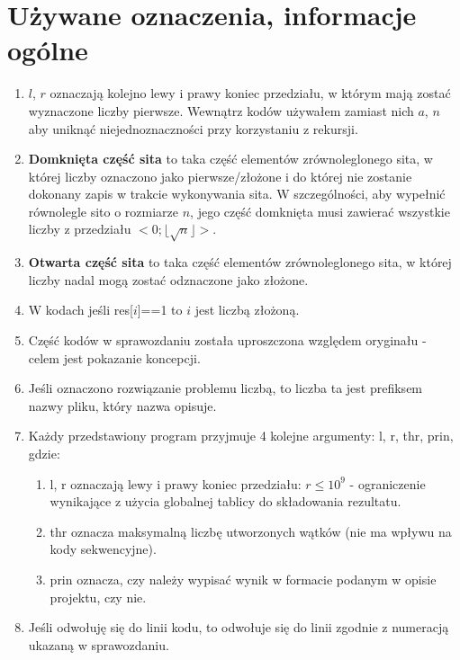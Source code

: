 \documentclass[12pt]{article}
\begin{document}
\section{Używane oznaczenia, informacje ogólne}
\begin{enumerate}
	\item \(l\), \(r\) oznaczają kolejno lewy i prawy koniec przedziału, w którym mają zostać wyznaczone liczby pierwsze. Wewnątrz kodów używałem zamiast nich \(a\), \(n\) aby uniknąć niejednoznaczności przy korzystaniu z rekursji.
	\item \textbf{Domknięta część sita} to taka część elementów zrównoleglonego sita, w której liczby oznaczono jako pierwsze/złożone i do której nie zostanie dokonany zapis w trakcie wykonywania sita. W szczególności, aby wypełnić równolegle sito o rozmiarze \(n\), jego część domknięta musi zawierać wszystkie liczby z przedziału \(<0;\lfloor\sqrt{n}\rfloor>\).
	\item \textbf{Otwarta część sita} to taka część elementów zrównoleglonego sita, w której liczby nadal mogą zostać odznaczone jako złożone.
	\item W kodach jeśli res[\(i\)]==1 to \(i\) jest liczbą złożoną.
	\item Część kodów w sprawozdaniu została uproszczona względem oryginału - celem jest pokazanie koncepcji.
	\item Jeśli oznaczono rozwiązanie problemu liczbą, to liczba ta jest prefiksem nazwy pliku, który nazwa opisuje.
	\item Każdy przedstawiony program przyjmuje 4 kolejne argumenty: l, r, thr, prin, gdzie:
	\begin{enumerate}
		\item l, r oznaczają lewy i prawy koniec przedziału: \(r\le 10^9\) - ograniczenie wynikające z użycia globalnej tablicy do składowania rezultatu.
		\item thr oznacza maksymalną liczbę utworzonych wątków (nie ma wpływu na kody sekwencyjne).
		\item prin oznacza, czy należy wypisać wynik w formacie podanym w opisie projektu, czy nie.
	\end{enumerate}
	\item Jeśli odwołuję się do linii kodu, to odwołuje się do linii zgodnie z numeracją ukazaną w sprawozdaniu.
\end{enumerate}
\end{document}
